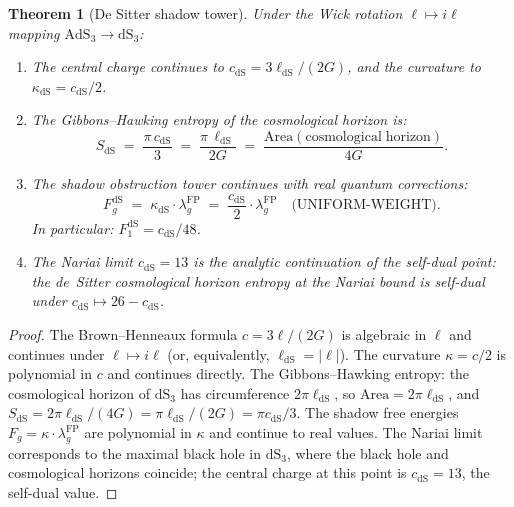 \documentclass[11pt,reqno]{amsart}
\newtheorem{theorem}{Theorem}[section]
\theoremstyle{definition}
\theoremstyle{remark}
\begin{document}
\begin{theorem}[De Sitter shadow tower]
\label{thm:desitter}
Under the Wick rotation $\ell \mapsto i\ell$ mapping\/
$\mathrm{AdS}_3 \to \mathrm{dS}_3$:
\begin{enumerate}[label=\textup{(\roman*)}]
\item The central charge continues to\/
  $c_{\mathrm{dS}} = 3\ell_{\mathrm{dS}}/(2G)$, and the curvature
  to\/ $\kappa_{\mathrm{dS}} = c_{\mathrm{dS}}/2$.
\item The Gibbons--Hawking entropy of the cosmological horizon is:
  \begin{equation}\label{eq:gibbons-hawking}
  S_{\mathrm{dS}}
  \;=\;
  \frac{\pi\,c_{\mathrm{dS}}}{3}
  \;=\;
  \frac{\pi\,\ell_{\mathrm{dS}}}{2G}
  \;=\;
  \frac{\mathrm{Area}(\mathrm{cosmological\;horizon})}{4G}.
  \end{equation}
\item The shadow obstruction tower continues with real quantum
  corrections:
  \begin{equation}\label{eq:desitter-Fg}
  F_g^{\mathrm{dS}}
  \;=\;
  \kappa_{\mathrm{dS}} \cdot \lambda_g^{\mathrm{FP}}
  \;=\;
  \frac{c_{\mathrm{dS}}}{2} \cdot \lambda_g^{\mathrm{FP}}
  \quad\text{(UNIFORM-WEIGHT)}.
  \end{equation}
  In particular: $F_1^{\mathrm{dS}} = c_{\mathrm{dS}}/48$.
\item The Nariai limit\/ $c_{\mathrm{dS}} = 13$ is the analytic
  continuation of the self-dual point: the de~Sitter cosmological
  horizon entropy at the Nariai bound is self-dual under
  $c_{\mathrm{dS}} \mapsto 26 - c_{\mathrm{dS}}$.
\end{enumerate}
\end{theorem}

\begin{proof}
The Brown--Henneaux formula $c = 3\ell/(2G)$ is algebraic in
$\ell$ and continues under $\ell \mapsto i\ell$ (or, equivalently,
$\ell_{\mathrm{dS}} = |\ell|$). The curvature
$\kappa = c/2$ is polynomial in $c$ and continues directly.
The Gibbons--Hawking entropy: the cosmological horizon of
$\mathrm{dS}_3$ has circumference $2\pi\ell_{\mathrm{dS}}$,
so $\mathrm{Area} = 2\pi\ell_{\mathrm{dS}}$, and
$S_{\mathrm{dS}} = 2\pi\ell_{\mathrm{dS}}/(4G)
= \pi\ell_{\mathrm{dS}}/(2G)
= \pi c_{\mathrm{dS}}/3$.
The shadow free energies $F_g = \kappa \cdot
\lambda_g^{\mathrm{FP}}$ are polynomial in $\kappa$ and continue
to real values. The Nariai limit corresponds to the maximal
black hole in $\mathrm{dS}_3$, where the black hole and
cosmological horizons coincide; the central charge at this point
is $c_{\mathrm{dS}} = 13$, the self-dual value.
\end{proof}
\end{document}
